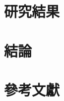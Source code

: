 \documentclass[12pt]{article}       %
\begin{document}


\section{\centering 研究結果}





\section{\centering 結論} 




\section{\centering 參考文獻}
\vspace{-3.5em}  %
\renewcommand{\refname}{}  %
\printbibliography  %
\end{document}
